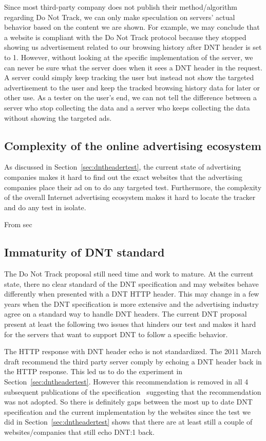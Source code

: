 \documentclass{sig-alternate}
\begin{document}
Since most third-party company does not publish their method/algorithm regarding Do Not Track, we can only make speculation on servers' actual behavior based on the content we are shown. For example, we may conclude that a website is compliant with the Do Not Track protocol because they stopped showing us advertisement related to our browsing history after DNT header is set to 1. However, without looking at the specific implementation of the server, we can never be sure what the server does when it sees a DNT header in the request. A server could simply keep tracking the user but instead not show the targeted advertisement to the user and keep the tracked browsing history data for later or other use. As a tester on the user’s end, we can not tell the difference between a server who stop collecting the data and a server who keeps collecting the data without showing the targeted ads. 

\subsection{Complexity of the online advertising ecosystem} \label{sec:complexity}

As discussed in Section~\ref{sec:dntheadertest}, the current state of advertising companies makes it hard to find out the exact websites that the advertising companies place their ad on to do any targeted test. Furthermore, the complexity of the overall Internet advertising ecosystem makes it hard to locate the tracker and do any test in isolate. 

From sec

\subsection{Immaturity of DNT standard}

The Do Not Track proposal still need time and work to mature. At the current state, there no clear standard of the DNT specification and may websites behave differently when presented with a DNT HTTP header. This may change in a few years when the DNT specification is more extensive and the advertising industry agree on a standard way to handle DNT headers. The current DNT proposal present at least the following two issues that hinders our test and makes it hard for the servers that want to support DNT to follow a specific behavior.

The HTTP response with DNT header echo is not standardized. The 2011 March draft recommend the third party server comply by echoing a DNT header back in the HTTP response. This led us to do the experiment in Section~\ref{sec:dntheadertest}. However this recommendation is removed in all 4 subsequent publications of the specification~\cite{tracking_dnt20130430, tracking_dnt20121002, tracking_dnt20120313, tracking_dnt20111114} suggesting that the recommendation was not adopted. So there is definitely gaps between the most up to date DNT specification and the current implementation by the websites since the test we did in Section~\ref{sec:dntheadertest} shows that there are at least still a couple of websites/companies that still echo DNT:1 back.
\end{document}
